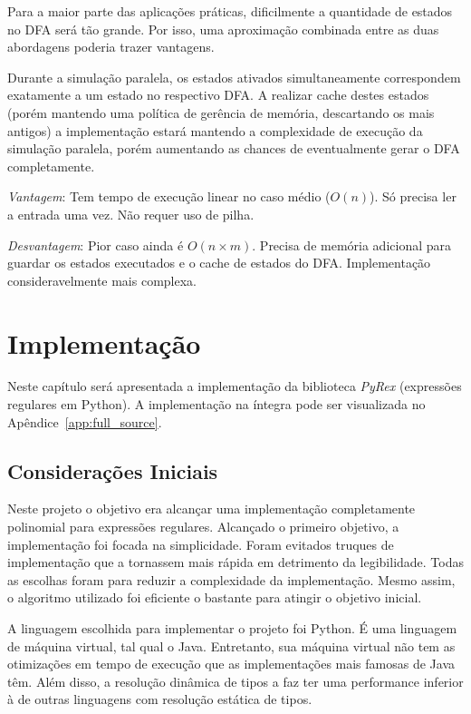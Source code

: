 \documentclass[a4paper,12pt,oneside,onecolumn]{uerj}
\begin{document}
Para a maior parte das aplicações práticas, dificilmente a quantidade de estados no DFA será tão grande. Por isso, uma aproximação combinada entre as duas abordagens poderia trazer vantagens.

Durante a simulação paralela, os estados ativados simultaneamente correspondem exatamente a um estado no respectivo DFA. A realizar cache destes estados (porém mantendo uma política de gerência de memória, descartando os mais antigos) a implementação estará mantendo a complexidade de execução da simulação paralela, porém aumentando as chances de eventualmente gerar o DFA completamente.

\emph{Vantagem}: Tem tempo de execução linear no caso médio ($O(n)$). Só precisa ler a entrada uma vez. Não requer uso de pilha.

\emph{Desvantagem}: Pior caso ainda é $O(n \times m)$. Precisa de memória adicional para guardar os estados executados e o cache de estados do DFA. Implementação consideravelmente mais complexa.

\chapter{Implementação}\label{cap:implementation}

Neste capítulo será apresentada a implementação da biblioteca \emph{PyRex} (expressões regulares em Python). A implementação na íntegra pode ser visualizada no Apêndice~\ref{app:full_source}.

\section{Considerações Iniciais}

Neste projeto o objetivo era alcançar uma implementação completamente polinomial para expressões regulares. Alcançado o primeiro objetivo, a implementação foi focada na simplicidade. Foram evitados truques de implementação que a tornassem mais rápida em detrimento da legibilidade. Todas as escolhas foram para reduzir a complexidade da implementação. Mesmo assim, o algoritmo utilizado foi eficiente o bastante para atingir o objetivo inicial.

A linguagem escolhida para implementar o projeto foi Python. É uma linguagem de máquina virtual, tal qual o Java. Entretanto, sua máquina virtual não tem as otimizações em tempo de execução que as implementações mais famosas de Java têm. Além disso, a resolução dinâmica de tipos a faz ter uma performance inferior à de outras linguagens com resolução estática de tipos. 
\end{document}
